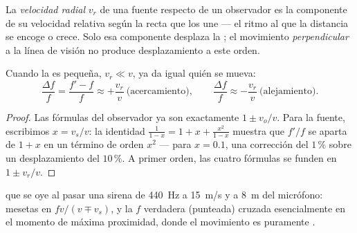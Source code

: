 \begin{definition}\label{def:g12:doppler-effect:radial}
La \emph{velocidad radial} $v_r$ de una fuente
respecto de un observador es la componente de su velocidad relativa
según la recta que los une --- el ritmo al que la distancia se encoge o
crece. Solo esa componente desplaza la ; el movimiento
\emph{perpendicular} a la línea de visión no produce desplazamiento a
este orden.
\end{definition}

\begin{proposition}\label{prop:g12:doppler-effect:slow}
Cuando la  es pequeña, $v_r \ll v$, ya da igual quién se
mueva:
\[
\frac{\Delta f}{f} = \frac{f' - f}{f} \approx +\frac{v_r}{v} \ \text{(acercamiento)},
\qquad
\frac{\Delta f}{f} \approx -\frac{v_r}{v} \ \text{(alejamiento)}.
\]
\end{proposition}

\begin{proof}
Las fórmulas del observador ya son exactamente $1 \pm v_o/v$. Para la
fuente, escribimos $x = v_s/v$: la identidad
$\frac{1}{1 - x} = 1 + x + \frac{x^2}{1 - x}$ muestra que $f'/f$ se
aparta de $1 + x$ en un término de orden $x^2$ --- para $x = 0.1$, una
corrección del $1\,\%$ sobre un desplazamiento del $10\,\%$. A primer orden,
las cuatro fórmulas se funden en $1 \pm v_r/v$.
\end{proof}

\begin{omfigure}

{\small {} que se oye al pasar una sirena de \qty{440}{Hz} a
\qty{15}{m/s} y a \qty{8}{m} del micrófono: mesetas en
$fv/(v \mp v_s)$, y la $f$ verdadera (punteada) cruzada esencialmente en
el momento de máxima proximidad, donde el movimiento es puramente
.}
\end{omfigure}

